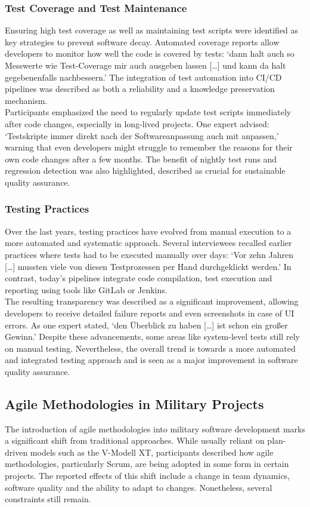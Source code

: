 \subsubsection{Test Coverage and Test Maintenance}
Ensuring high test coverage as well as maintaining test scripts were identified as key strategies to prevent software decay. Automated coverage reports allow developers to monitor how well the code is covered by tests: `dann halt auch so Messwerte wie Test-Coverage mir auch ausgeben lassen [\ldots] und kann da halt gegebenenfalls nachbessern.'
The integration of test automation into CI/CD pipelines was described as both a reliability and a knowledge preservation mechanism.\\
Participants emphasized the need to regularly update test scripts immediately after code changes, especially in long-lived projects. One expert advised: `Testskripte immer direkt nach der Softwareanpassung auch mit anpassen,' warning that even developers might struggle to remember the reasons for their own code changes after a few months.
The benefit of nightly test runs and regression detection was also highlighted, described as crucial for sustainable quality assurance.\\

\subsubsection{Testing Practices}
Over the last years, testing practices have evolved from manual execution to a more automated and systematic approach. Several interviewees recalled earlier practices where tests had to be executed manually over days: `Vor zehn Jahren [\ldots] mussten viele von diesen Testprozessen per Hand durchgeklickt werden.' In contrast, today's pipelines
integrate code compilation, test execution and reporting using tools like GitLab or Jenkins.\\
The resulting transparency was described as a significant improvement, allowing developers to receive detailed failure reports and even screenshots in case of \ac{UI} errors. As one expert stated, `den Überblick zu haben [\ldots] ist schon ein großer Gewinn.'
Despite these advancements, some areas like system-level tests still rely on manual testing. Nevertheless, the overall trend is towards a more automated and integrated testing approach and is seen as a major improvement in software quality assurance.\\

\subsection{Agile Methodologies in Military Projects}
The introduction of agile methodologies into military software development marks a significant shift from traditional approaches. While usually reliant on plan-driven models such as the V-Modell XT, participants described how agile methodologies, particularly Scrum, are being adopted in some form in certain projects.
The reported effects of this shift include a change in team dynamics, software quality and the ability to adapt to changes. Nonetheless, several constraints still remain.

